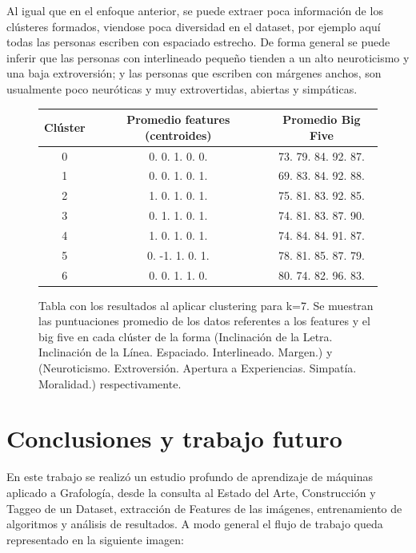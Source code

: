 \documentclass[10pt, a4paper]{article}
\begin{document}
    	Al igual que en el enfoque anterior, se puede extraer poca informaci\'on de los cl\'usteres formados, viendose poca diversidad en el dataset, por ejemplo aqu\'i todas las personas escriben con espaciado estrecho. De forma general se puede inferir que las personas con interlineado peque\~no tienden a un alto neuroticismo y una baja extroversi\'on; y las personas que escriben con m\'argenes anchos, son usualmente poco neur\'oticas y muy extrovertidas, abiertas y simp\'aticas.
    	
    \begin{figure}[H]
    	\centering
    		\begin{tabular}[H]{|c|c|c|}
    		\hline Cl\'uster & Promedio features (centroides) & Promedio Big Five  \\  
    		\hline 0 & 0. 0.  1.  0. 0. & 73. 79. 84. 92. 87. \\
    		\hline 1 & 0.  0.  1.  0.  1. & 69. 83. 84. 92. 88.\\
    		\hline 2 &  1.  0.  1. 0.  1. & 75. 81. 83. 92. 85. \\
    		\hline 3 & 0. 1. 1. 0. 1. & 74. 81. 83. 87. 90. \\
    		\hline 4 & 1. 0.  1.  0.  1. & 74. 84. 84. 91. 87. \\
    		\hline 5 &  0. -1. 1.  0.  1. & 78. 81. 85. 87. 79. \\
    		\hline 6 & 0. 0. 1.  1. 0. & 80. 74. 82. 96. 83. \\
    		\hline
    	\end{tabular}
    \caption{Tabla con los resultados al aplicar clustering para k=7. Se muestran las puntuaciones promedio de los datos referentes a los features y el big five en cada cl\'uster de la forma (Inclinaci\'on de la Letra. Inclinaci\'on de la L\'inea. Espaciado. Interlineado. Margen.) y (Neuroticismo. Extroversi\'on. Apertura a Experiencias. Simpat\'ia. Moralidad.) respectivamente.}
    \end{figure}
    
    
   
    
   
   
    
    \section{Conclusiones y trabajo futuro}
        En este trabajo se realiz\'o un estudio profundo de aprendizaje de m\'aquinas aplicado a Grafolog\'ia, desde la consulta al Estado del Arte, Construcci\'on y Taggeo de un Dataset, extracci\'on de Features de las im\'agenes, entrenamiento de algoritmos y an\'alisis de resultados. A modo general el flujo de trabajo queda representado en la siguiente imagen: 
\end{document}
